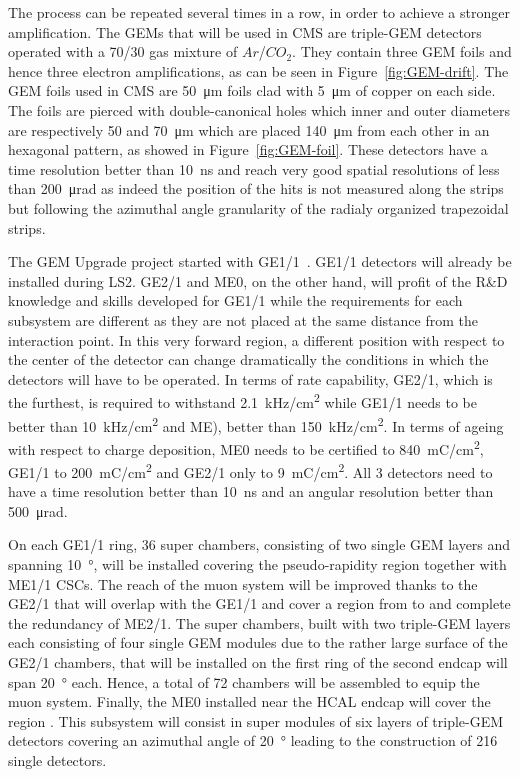 	The process can be repeated several times in a row, in order to achieve a stronger amplification. The GEMs that will be used in CMS are triple-GEM detectors operated with a 70/30 gas mixture of $Ar$/$CO_2$. They contain three GEM foils and hence three electron amplifications, as can be seen in Figure~\ref{fig:GEM-drift}. The GEM foils used in CMS are \SI{50}{\micro m} foils clad with \SI{5}{\micro m} of copper on each side. The foils are pierced with double-canonical holes which inner and outer diameters are respectively 50 and \SI{70}{\micro m} which are placed \SI{140}{\micro m} from each other in an hexagonal pattern, as showed in Figure~\ref{fig:GEM-foil}. These detectors have a time resolution better than \SI{10}{ns} and reach very good spatial resolutions of less than \SI{200}{\micro rad} as indeed the position of the hits is not measured along the strips but following the azimuthal angle granularity of the radialy organized trapezoidal strips.
	
\endgroup
	
	The GEM Upgrade project started with GE1/1~\cite{GEM11TDR}. GE1/1 detectors will already be installed during LS2. GE2/1 and ME0, on the other hand, will profit of the R\&D knowledge and skills developed for GE1/1 while the requirements for each subsystem are different as they are not placed at the same distance from the interaction point. In this very forward region, a different position with respect to the center of the detector can change dramatically the conditions in which the detectors will have to be operated. In terms of rate capability, GE2/1, which is the furthest, is required to withstand \SI{2.1}{kHz/cm^2} while GE1/1 needs to be better than \SI{10}{kHz/cm^2} and ME), better than \SI{150}{kHz/cm^2}. In terms of ageing with respect to charge deposition, ME0 needs to be certified to \SI{840}{mC/cm^2}, GE1/1 to \SI{200}{mC/cm^2} and GE2/1 only to \SI{9}{mC/cm^2}. All 3 detectors need to have a time resolution better than \SI{10}{ns} and an angular resolution better than \SI{500}{\micro rad}.
	
	On each GE1/1 ring, 36 super chambers, consisting of two single GEM layers and spanning \SI{10}{\degree}, will be installed covering the pseudo-rapidity region  together with ME1/1 CSCs. The reach of the muon system will be improved thanks to the GE2/1 that will overlap with the GE1/1 and cover a region from  to  and complete the redundancy of ME2/1. The super chambers, built with two triple-GEM layers each consisting of four single GEM modules due to the rather large surface of the GE2/1 chambers, that will be installed on the first ring of the second endcap will span \SI{20}{\degree} each. Hence, a total of 72 chambers will be assembled to equip the muon system. Finally, the ME0 installed near the HCAL endcap will cover the region . This subsystem will consist in super modules of six layers of triple-GEM detectors covering an azimuthal angle of \SI{20}{\degree} leading to the construction of 216 single detectors.
	
